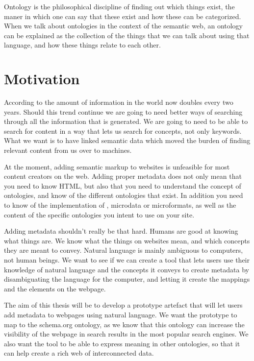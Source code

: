 Ontology is the philosophical discipline of finding out which things exist,
the maner in which one can say that these exist and how these can be categorized.
When we talk about ontologies in the context of the semantic web,
an ontology can be explained as the collection of the things that we can talk about using that language,
and how these things relate to each other.


\section{Motivation}
According to \citet{Gantz2011} the amount of information in the world now doubles every two years.
Should this trend continue we are going to need better ways of searching through all the information that is generated.
We are going to need to be able to search for content in a way that lets us search for concepts, not only keywords.
What we want is to have linked semantic data which moved the burden of finding relevant content from us over to machines.

At the moment, adding semantic markup to websites is unfeasible for most content creators on the web.
Adding proper metadata does not only mean that you need to know HTML,
but also that you need to understand the concept of ontologies, and know of the different ontologies that exist.
In addition you need to know of the implementation of , microdata or microformats,
as well as the content of the specific ontologies you intent to use on your site.

Adding metadata shouldn't really be that hard.
Humans are good at knowing what things are.
We know what the things on websites mean, and which concepts they are meant to convey.
Natural language is mainly ambiguous to computers, not human beings.
We want to see if we can create a tool that lets users use their knowledge of natural language and the concepts it conveys
to create metadata by disambiguating the language for the computer, and letting it create the mappings and the elements on the webpage.

The aim of this thesis will be to develop a prototype artefact that will let users add metadata to webpages using natural language.
We want the prototype to map to the schema.org ontology,
as we know that this ontology can increase the visibility of the webpage in search results in the most popular search engines.
We also want the tool to be able to express meaning in other ontologies, so that it can help create a rich web of interconnected data.

